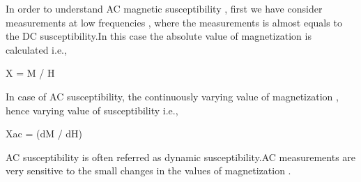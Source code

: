 In order to understand AC magnetic susceptibility , first we have consider measurements at low frequencies , where the 
measurements is almost equals to the DC susceptibility.In this case the absolute value of magnetization is calculated i.e.,

 Χ = M / H

In case of AC susceptibility, the continuously varying value of magnetization , hence varying value of susceptibility i.e.,

 Χac = (dM / dH)

AC susceptibility is often referred as dynamic susceptibility.AC measurements are very sensitive to the small changes in the values of magnetization .

